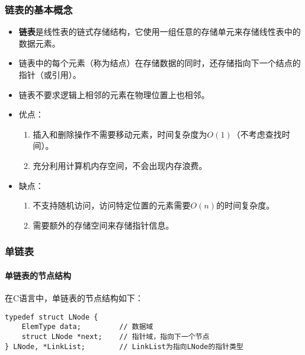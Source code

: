 \documentclass{../../note}
\begin{document}
\subsubsection{链表的基本概念}
\begin{itemize}
  \item \textbf{链表}是线性表的链式存储结构，它使用一组任意的存储单元来存储线性表中的数据元素。
  \item 链表中的每个元素（称为结点）在存储数据的同时，还存储指向下一个结点的指针（或引用）。
  \item 链表不要求逻辑上相邻的元素在物理位置上也相邻。
  \item 优点：
    \begin{enumerate}
      \item 插入和删除操作不需要移动元素，时间复杂度为$O(1)$（不考虑查找时间）。
      \item 充分利用计算机内存空间，不会出现内存浪费。
    \end{enumerate}
  \item 缺点：
    \begin{enumerate}
      \item 不支持随机访问，访问特定位置的元素需要$O(n)$的时间复杂度。
      \item 需要额外的存储空间来存储指针信息。
    \end{enumerate}
\end{itemize}

\subsubsection{单链表}

\paragraph{单链表的节点结构}
在C语言中，单链表的节点结构如下：

\begin{verbatim}
typedef struct LNode {
    ElemType data;         // 数据域
    struct LNode *next;    // 指针域，指向下一个节点
} LNode, *LinkList;        // LinkList为指向LNode的指针类型
\end{verbatim}
\end{document}
